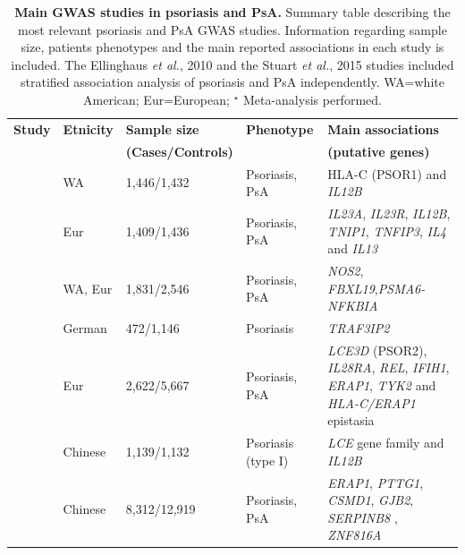 %
\begin{landscape}
\begin{center}
\begin{longtable}[ht]{p{.25\textheight} p{.25\textheight} p{.20\textheight} p{.20\textheight} p{.50\textheight}}
\caption[Main GWAS studies in psoriasis and PsA]{\textbf{Main GWAS studies in psoriasis and PsA.} Summary table describing the most relevant psoriasis and PsA GWAS studies. Information regarding sample size, patients phenotypes and the main reported associations in each study is included. The Ellinghaus \textit{et al.}, 2010 and the Stuart \textit{et al.}, 2015 studies included stratified association analysis of psoriasis and PsA independently. WA=white American; Eur=European; $^\star$ Meta-analysis performed.}
\label{tab:GWAS_summary} \\
\toprule
\textbf{Study} & \textbf{Etnicity} & \textbf{Sample size}      & \textbf{Phenotype} & \textbf{Main associations} \\
               &                   & \textbf{(Cases/Controls)} &                    &  \textbf{(putative genes)}                  \\
\midrule
\midrule
\parencite{Cargill2007} &	WA &	1,446/1,432 &	Psoriasis, PsA &	HLA-C (PSOR1) and \textit{IL12B} \\
\parencite{Nair2009} &	Eur	& 1,409/1,436 &	Psoriasis, PsA &	\textit{IL23A}, \textit{IL23R}, \textit{IL12B}, \textit{TNIP1}, \textit{TNFIP3}, \textit{IL4} and \textit{IL13} \\
\parencite{Stuart2010} &	WA, Eur &	1,831/2,546	& Psoriasis, PsA &	\textit{NOS2}, \textit{FBXL19},\textit{PSMA6-NFKBIA} \\

\parencite{Ellinghaus2010} &	German	& 472/1,146	& Psoriasis	& \textit{TRAF3IP2} \\

\parencite{Strange2010} &	Eur & 2,622/5,667 & Psoriasis, PsA & \textit{LCE3D} (PSOR2), \textit{IL28RA}, \textit{REL}, \textit{IFIH1}, \textit{ERAP1}, \textit{TYK2} and \textit{HLA-C/ERAP1} epistasia \\

\parencite{Zhang2008} & Chinese	& 1,139/1,132	& Psoriasis (type I)  & \textit{LCE} gene family and \textit{IL12B} \\

\parencite{Sun2010} & Chinese	& 8,312/12,919	& Psoriasis, PsA &	\textit{ERAP1}, \textit{PTTG1}, \textit{CSMD1}, \textit{GJB2}, \textit{SERPINB8} , \textit{ZNF816A} \\


\end{longtable}
\end{center}
\end{landscape}

